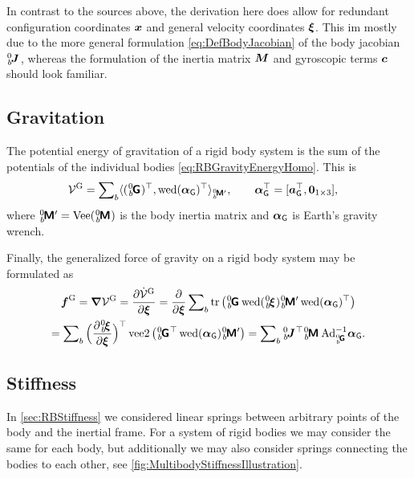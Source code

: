 In contrast to the sources above, the derivation here does allow for redundant configuration coordinates $\boldsymbol{x}$ and general velocity coordinates $\boldsymbol{\xi}$.
This im mostly due to the more general formulation \eqref{eq:DefBodyJacobian} of the body jacobian $\bodyJac{0}{\BidxII}$, whereas the formulation of the inertia matrix $\boldsymbol{M}$ and gyroscopic terms $\boldsymbol{c}$ should look familiar.

\subsection{Gravitation}
The potential energy of gravitation of a rigid body system is the sum of the potentials of the individual bodies \eqref{eq:RBGravityEnergyHomo}.
This is
\begin{align}\label{eq:RBSPotentialGravity}
 \potentialGravity
 &= \sumBodies \sProd[\bodyInertiaMatp{0}{\BidxII}]{(\bodyHomoCoord{0}{\BidxII})^\top}{\wedOp(\gravityAccWrench)^\top},
\qquad 
 \gravityAccWrench^\top = [\gravityAcc^\top, \tuple{0}_{1\times3} ],
\end{align}
where $\bodyInertiaMatp{0}{\BidxII} = \veeMatOp(\bodyInertiaMat{0}{\BidxII})$ is the body inertia matrix and $\boldsymbol{\alpha}_{\mathsf{G}}$ is Earth's gravity wrench.

Finally, the generalized force of gravity on a rigid body system may be formulated as
\begin{multline}\label{eq:RBSGenForceGravity}
 \genForceGravity = \differential\potentialGravity
 = \frac{\partial \potentialGravityd}{\partial \sysVel}
 = \frac{\partial}{\partial \sysVel} \sumBodies \tr\big( \bodyHomoCoord{0}{\BidxII} \wedOp(\bodyVel{0}{\BidxII}) \bodyInertiaMatp{0}{\BidxII} \wedOp(\gravityAccWrench)^\top \big)
\\ 
 = \sumBodies \Big(\frac{\partial \bodyVel{0}{\BidxII}}{\partial \sysVel}\Big)^\top \veeTwoOp\big( \bodyHomoCoord{0}{\BidxII}^\top \wedOp(\gravityAccWrench) \bodyInertiaMatp{0}{\BidxII} \big) 
 = \sumBodies \bodyJac{0}{\BidxII}^\top \bodyInertiaMat{0}{\BidxII} \, \Ad{\bodyHomoCoord{0}{\BidxII}}^{-1} \gravityAccWrench.
\end{multline}

\subsection{Stiffness}
In \autoref{sec:RBStiffness} we considered linear springs between arbitrary points of the body and the inertial frame.
For a system of rigid bodies we may consider the same for each body, but additionally we may also consider springs connecting the bodies to each other, see \autoref{fig:MultibodyStiffnessIllustration}.

